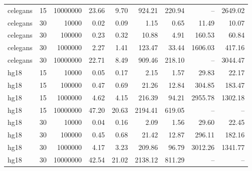 \begin{tabular}{lrrrrrrrr}
  celegans &  15 & 10000000 & 23.66 & 9.70 & 924.21 & 220.94 & -- & 2649.02 \\ 
  celegans &  30 & 10000 & 0.02 & 0.09 & 1.15 & 0.65 & 11.49 & 10.07 \\ 
  celegans &  30 & 100000 & 0.23 & 0.32 & 10.88 & 4.91 & 160.53 & 60.84 \\ 
  celegans &  30 & 1000000 & 2.27 & 1.41 & 123.47 & 33.44 & 1606.03 & 417.16 \\ 
  celegans &  30 & 10000000 & 22.71 & 8.49 & 909.46 & 218.10 & -- & 3044.47 \\ 
  hg18 &  15 & 10000 & 0.05 & 0.17 & 2.15 & 1.57 & 29.83 & 22.17 \\ 
  hg18 &  15 & 100000 & 0.47 & 0.69 & 21.26 & 12.84 & 304.85 & 183.47 \\ 
  hg18 &  15 & 1000000 & 4.62 & 4.15 & 216.39 & 94.21 & 2955.78 & 1302.18 \\ 
  hg18 &  15 & 10000000 & 47.20 & 20.63 & 2194.41 & 619.05 & -- & -- \\ 
  hg18 &  30 & 10000 & 0.04 & 0.16 & 2.09 & 1.56 & 29.60 & 22.45 \\ 
  hg18 &  30 & 100000 & 0.45 & 0.68 & 21.42 & 12.87 & 296.11 & 182.16 \\ 
  hg18 &  30 & 1000000 & 4.17 & 3.23 & 209.86 & 96.79 & 3012.26 & 1341.77 \\ 
  hg18 &  30 & 10000000 & 42.54 & 21.02 & 2138.12 & 811.29 & -- & -- \\ 
   \bottomrule \end{tabular}
